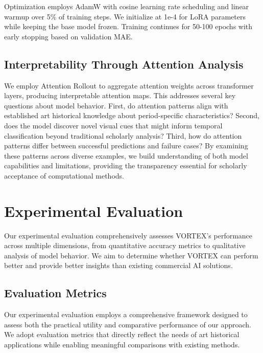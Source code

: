 \documentclass[10pt,twocolumn,letterpaper]{article}
\begin{document}
Optimization employs AdamW with cosine learning rate scheduling and linear warmup over 5\% of training steps. We initialize at 1e-4 for LoRA parameters while keeping the base model frozen. Training continues for 50-100 epochs with early stopping based on validation MAE.

\subsection{Interpretability Through Attention Analysis}

We employ Attention Rollout \cite{Abnar20AttentionRollout} to aggregate attention weights across transformer layers, producing interpretable attention maps. This addresses several key questions about model behavior. First, do attention patterns align with established art historical knowledge about period-specific characteristics? Second, does the model discover novel visual cues that might inform temporal classification beyond traditional scholarly analysis? Third, how do attention patterns differ between successful predictions and failure cases? By examining these patterns across diverse examples, we build understanding of both model capabilities and limitations, providing the transparency essential for scholarly acceptance of computational methods.

\section{Experimental Evaluation}

Our experimental evaluation comprehensively assesses VORTEX's performance across multiple dimensions, from quantitative accuracy metrics to qualitative analysis of model behavior. We aim to determine whether VORTEX can perform better and provide better insights than existing commercial AI solutions.

\subsection{Evaluation Metrics}


Our experimental evaluation employs a comprehensive framework designed to assess both the practical utility and comparative performance of our approach. We adopt evaluation metrics that directly reflect the needs of art historical applications while enabling meaningful comparisons with existing methods.
\end{document}
